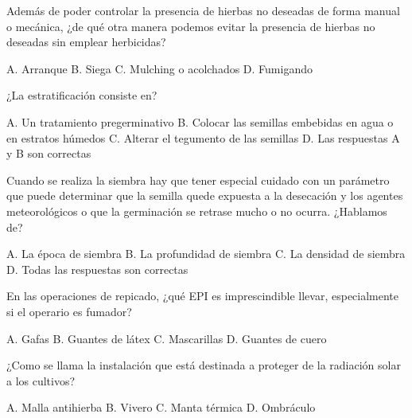 \documentclass[11pt]{exam}
\begin{document}
{\begin{questions}
\question Además de poder controlar la presencia de hierbas no deseadas de forma manual o
  mecánica, ¿de qué otra manera podemos evitar la presencia de hierbas no deseadas sin
  emplear herbicidas?
  \begin{checkboxes}
    \choice A. Arranque
    \choice B. Siega
    \CorrectChoice C. Mulching o acolchados
    \choice D. Fumigando
  \end{checkboxes}
\question ¿La estratificación consiste en?
  \begin{checkboxes}
    \choice A. Un tratamiento pregerminativo
    \choice B. Colocar las semillas embebidas en agua o en estratos húmedos
    \choice C. Alterar el tegumento de las semillas
    \CorrectChoice D. Las respuestas A y B son correctas
  \end{checkboxes}
\question Cuando se realiza la siembra hay que tener especial cuidado con un parámetro que
  puede determinar que la semilla quede expuesta a la desecación y los agentes
  meteorológicos o que la germinación se retrase mucho o no ocurra. ¿Hablamos de?
  \begin{checkboxes}
    \choice A. La época de siembra
    \CorrectChoice B. La profundidad de siembra
    \choice C. La densidad de siembra
    \choice D. Todas las respuestas son correctas
  \end{checkboxes}
\question En las operaciones de repicado, ¿qué EPI es imprescindible llevar, especialmente
  si el operario es fumador?
  \begin{checkboxes}
    \choice A. Gafas
    \CorrectChoice B. Guantes de látex
    \choice C. Mascarillas
    \choice D. Guantes de cuero
  \end{checkboxes}
\question ¿Como se llama la instalación que está destinada a proteger de la radiación
  solar a los cultivos?
  \begin{checkboxes}
    \choice A. Malla antihierba
    \choice B. Vivero
    \choice C. Manta térmica
    \CorrectChoice D. Ombráculo
  \end{checkboxes}
\end{questions}

}
\end{document}
